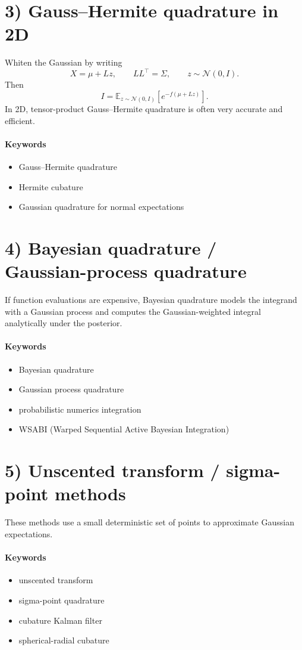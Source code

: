 \documentclass{article}
\begin{document}
\section*{3) Gauss--Hermite quadrature in 2D}
Whiten the Gaussian by writing
\[
X = \mu + Lz, \qquad LL^\top = \Sigma,\qquad z \sim \mathcal N(0,I).
\]
Then
\[
I = \mathbb E_{z \sim \mathcal N(0,I)}\!\left[e^{-f(\mu + Lz)}\right].
\]
In 2D, tensor-product Gauss--Hermite quadrature is often very accurate and efficient.

\paragraph{Keywords}
\begin{itemize}
  \item Gauss--Hermite quadrature
  \item Hermite cubature
  \item Gaussian quadrature for normal expectations
\end{itemize}

\section*{4) Bayesian quadrature / Gaussian-process quadrature}
If function evaluations are expensive, Bayesian quadrature models the integrand with a Gaussian process and computes the Gaussian-weighted integral analytically under the posterior.

\paragraph{Keywords}
\begin{itemize}
  \item Bayesian quadrature
  \item Gaussian process quadrature
  \item probabilistic numerics integration
  \item WSABI (Warped Sequential Active Bayesian Integration)
\end{itemize}

\section*{5) Unscented transform / sigma-point methods}
These methods use a small deterministic set of points to approximate Gaussian expectations.

\paragraph{Keywords}
\begin{itemize}
  \item unscented transform
  \item sigma-point quadrature
  \item cubature Kalman filter
  \item spherical-radial cubature
\end{itemize}
\end{document}
